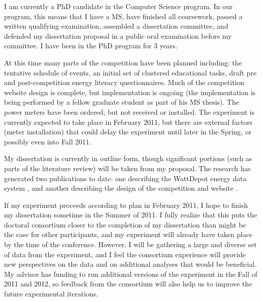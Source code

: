 \documentclass{chi-ext}
\begin{document}
\begin{multicols}{2}
I am currently a PhD candidate in the Computer Science program. In our program, this means that I have a MS, have finished all coursework, passed a written qualifying examination, assembled a dissertation committee, and defended my dissertation proposal in a public oral examination before my committee. I have been in the PhD program for 3 years.

At this time many parts of the competition have been planned including: the tentative schedule of events, an initial set of clustered educational tasks, draft pre and post-competition energy literacy questionnaires. Much of the competition website design is complete, but implementation is ongoing (the implementation is being performed by a fellow graduate student as part of his MS thesis). The power meters have been ordered, but not received or installed. The experiment is currently expected to take place in February 2011, but there are external factors (meter installation) that could delay the experiment until later in the Spring, or possibly even into Fall 2011.

My dissertation is currently in outline form, though significant portions (such as parts of the literature review) will be taken from my proposal. The research has generated two publications to date: one describing the WattDepot energy data system \cite{csdl2-10-05}, and another describing the design of the competition and website \cite{csdl2-10-07}.

If my experiment proceeds according to plan in February 2011, I hope to finish my dissertation sometime in the Summer of 2011. I fully realize that this puts the doctoral consortium closer to the completion of my dissertation than might be the case for other participants, and my experiment will already have taken place by the time of the conference. However, I will be gathering a large and diverse set of data from the experiment, and I feel the consortium experience will provide new perspectives on the data and on additional analyses that would be beneficial. My advisor has funding to run additional versions of the experiment in the Fall of 2011 and 2012, so feedback from the consortium will also help us to improve the future experimental iterations.




\end{multicols}
\end{document}
